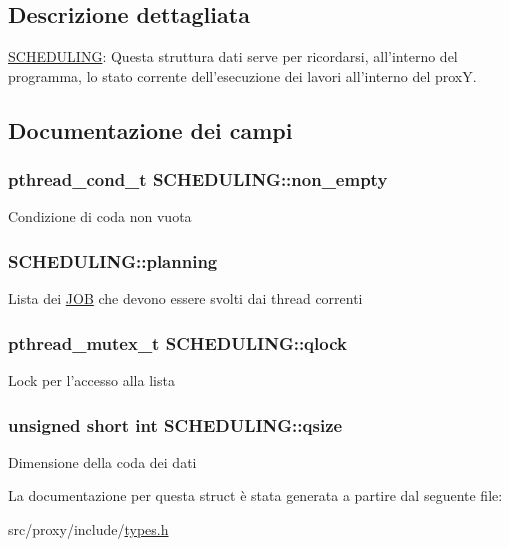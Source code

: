\subsection{Descrizione dettagliata}
\hyperlink{structSCHEDULING}{SCHEDULING}: Questa struttura dati serve per ricordarsi, all'interno del programma, lo stato corrente dell'esecuzione dei lavori all'interno del proxY. 

\subsection{Documentazione dei campi}
\hypertarget{structSCHEDULING_a5b4e86c8746c9ae4e032fd4d47947af8}{
\subsubsection[{non\_\-empty}]{\setlength{\rightskip}{0pt plus 5cm}pthread\_\-cond\_\-t {\bf SCHEDULING::non\_\-empty}}}
\label{structSCHEDULING_a5b4e86c8746c9ae4e032fd4d47947af8}
Condizione di coda non vuota \hypertarget{structSCHEDULING_a229bb49fdd326aa1018d1722fe912032}{
\subsubsection[{planning}]{ {\bf SCHEDULING::planning}}}
\label{structSCHEDULING_a229bb49fdd326aa1018d1722fe912032}
Lista dei \hyperlink{structJOB}{JOB} che devono essere svolti dai thread correnti \hypertarget{structSCHEDULING_aaec89a3dc46fa4387acabc5d0a82f0bd}{
\subsubsection[{qlock}]{\setlength{\rightskip}{0pt plus 5cm}pthread\_\-mutex\_\-t {\bf SCHEDULING::qlock}}}
\label{structSCHEDULING_aaec89a3dc46fa4387acabc5d0a82f0bd}
Lock per l'accesso alla lista \hypertarget{structSCHEDULING_a2e6094f26221c0be66ac7def1d02d337}{
\subsubsection[{qsize}]{\setlength{\rightskip}{0pt plus 5cm}unsigned short int {\bf SCHEDULING::qsize}}}
\label{structSCHEDULING_a2e6094f26221c0be66ac7def1d02d337}
Dimensione della coda dei dati 

La documentazione per questa struct è stata generata a partire dal seguente file:\begin{DoxyCompactItemize}
\item 
src/proxy/include/\hyperlink{types_8h}{types.h}\end{DoxyCompactItemize}
